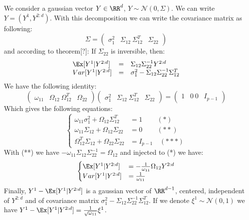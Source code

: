 We consider a gaussian vector $Y\in \RR^d$, $Y \sim \mathcal N(0,\Sigma)$. We can write $Y=(Y^1,Y^{2:d})$. With this decomposition we can write the covariance matrix as following:
\begin{equation}
\Sigma=
 \begin{pmatrix}
\sigma_1^2 & \Sigma_{12}\
\Sigma_{12}^T & \Sigma_{22}
\end{pmatrix}
\end{equation}
and according to theorem[?]: If $\Sigma_{22}$ is inversible, then:
\begin{equation}
\begin{array}{lcl}
\Ex[Y^1|Y^{2:d}]&=&\Sigma_{12}\Sigma_{22}^{-1}Y^{2:d}\\
Var[Y^1|Y^{2:d}]&=&\sigma_1^2-\Sigma_{12}\Sigma_{22}^{-1}\Sigma_{12}^T
\end{array}
\end{equation}
We have the following identity:
\begin{equation}
 \begin{pmatrix}
 \omega_{11}&\Omega_{12}\
 \Omega_{12}^T&\Omega_{22}
\end{pmatrix}
 \begin{pmatrix}
 \sigma_{1}^2&\Sigma_{12}\
 \Sigma_{12}^T&\Sigma_{22}
\end{pmatrix}
=
 \begin{pmatrix}
 1&0\
0&I_{p-1}
\end{pmatrix}
\end{equation}
Which gives the following equations:
\begin{equation}
  \begin{cases}
  \omega_{11}\sigma_1^2+\Omega_{12}\Sigma_{12}^T&=1\quad\,\quad(*) \\
  \omega_{11}\Sigma_{12}+\Omega_{12}\Sigma_{22}&=0\quad\,\quad(**)\\
  \Omega_{12}^T\Sigma_{12}+\Omega_{22}\Sigma_{22}&=I_{p-1}\quad(***)
  \end{cases}
\end{equation}
With (**) we have $-\omega_{11}\Sigma_{12}\Sigma_{22}^{-1}=\Omega_{12}$ and injected to (*) we have:
\begin{equation}
 \begin{cases}
 \Ex[Y^1|Y^{2:d}]&=-\frac{1}{\omega_{11}}\Omega_{12}Y^{2:d}\\
  Var[Y^1|Y^{2:d}]&=\frac{1}{\omega_{11}}
  \end{cases}
\end{equation}
Finally, $Y^1-\Ex[Y^1|Y^{2:d}]$ is a gaussian vector of $\RR^{d-1}$, centered, independent of $Y^{2:d}$ and of covariance matrix $\sigma_1^2-\Sigma_{12}\Sigma_{22}^{-1}\Sigma_{12}^T$. If we denote  $\xi^1\sim \mathcal N(0,1)$ we have $Y^1-\Ex[Y^1|Y^{2:d}]=\frac{1}{ \sqrt{\omega_{11}}}\xi^1$.\

